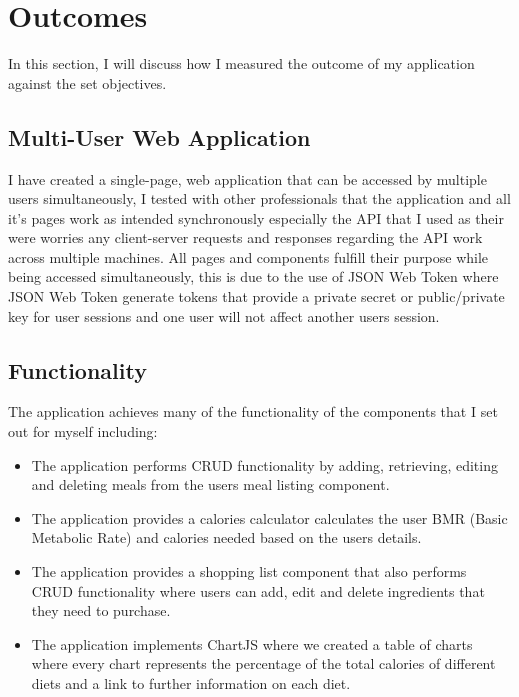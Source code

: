 \section{Outcomes}

In this section, I will discuss how I measured the outcome of my application against the set objectives.

\subsection{Multi-User Web Application}

I have created a single-page, web application that can be accessed by multiple users simultaneously, I tested with other professionals that the application and all it's pages work as intended synchronously especially the API that I used as their were worries any client-server requests and responses regarding the API work across multiple machines. All pages and components fulfill their purpose while being accessed simultaneously, this is due to the use of JSON Web Token where JSON Web Token generate tokens that provide a private secret or public/private key for user sessions and one user will not affect another users session.

\subsection{Functionality}

The application achieves many of the functionality of the components that I set out for myself including:

\begin{itemize}
    \item The application performs CRUD functionality by adding, retrieving, editing and deleting meals from the users meal listing component.
    \item The application provides a calories calculator calculates the user BMR (Basic Metabolic Rate) and calories needed based on the users details.
    \item The application provides a shopping list component that also performs CRUD functionality where users can add, edit and delete ingredients that they need to purchase.
    \item The application implements ChartJS where we created a table of charts where every chart represents the percentage of the total calories of different diets and a link to further information on each diet.
\end{itemize}

